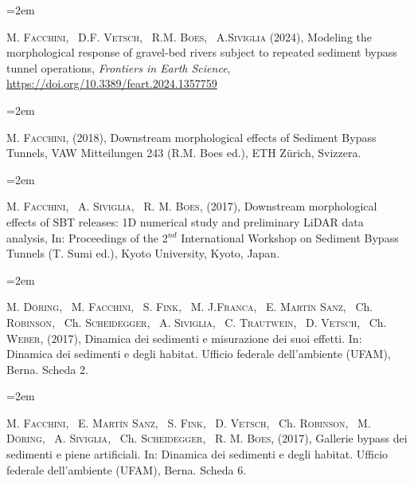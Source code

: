 \documentclass{scrartcl}
\newcommand{\MarginText}[1]{\marginpar{\raggedleft\itshape\small#1}} %
\newcommand{\Description}[1]{\hangindent=2em\hangafter=0\noindent\raggedright\footnotesize{#1}\par\normalsize\vspace{1em}} %
\begin{document}
\begin{cv}{}


\vspace{1em}

\Description{\MarginText{2024}
	M. \textsc{Facchini}, ~D.F. \textsc{Vetsch}, ~R.M. \textsc{Boes}, ~A.\textsc{Siviglia} (2024), Modeling the morphological response of gravel-bed rivers subject to repeated sediment bypass tunnel operations, \textit{Frontiers in Earth Science}, \url{https://doi.org/10.3389/feart.2024.1357759}}


\Description{\MarginText{2018}
	M. \textsc{Facchini}, (2018), Downstream morphological effects of Sediment Bypass Tunnels, VAW Mitteilungen 243 (R.M. Boes ed.), ETH Z\"urich, Svizzera.}


\Description{\MarginText{2017}
	M. \textsc{Facchini}, ~A. \textsc{Siviglia}, ~R. M. \textsc{Boes}, (2017), Downstream morphological effects of SBT releases: 1D numerical study and preliminary LiDAR data analysis, In: Proceedings of the 2$^{nd}$ International Workshop on Sediment Bypass Tunnels (T. Sumi ed.), Kyoto University, Kyoto, Japan.}

	\Description{
	M. \textsc{Döring}, ~M. \textsc{Facchini}, ~S. \textsc{Fink}, ~M. J.\textsc{Franca}, ~E. \textsc{Martín Sanz}, ~Ch. \textsc{Robinson}, ~Ch. \textsc{Scheidegger}, ~A. \textsc{Siviglia}, ~C. \textsc{Trautwein}, ~D. \textsc{Vetsch}, ~Ch. \textsc{Weber}, (2017), Dinamica dei sedimenti e misurazione dei suoi effetti. In: Dinamica dei sedimenti e degli habitat. Ufficio federale dell’ambiente (UFAM), Berna. Scheda 2.}

	\Description{
	M. \textsc{Facchini}, ~E. \textsc{Martín Sanz}, ~S. \textsc{Fink}, ~D. \textsc{Vetsch}, ~Ch. \textsc{Robinson}, ~M. \textsc{Döring}, ~A. \textsc{Siviglia}, ~Ch. \textsc{Scheidegger}, ~R. M. \textsc{Boes}, (2017), Gallerie bypass dei sedimenti e piene artificiali. In: Dinamica dei sedimenti e degli habitat. Ufficio federale dell’ambiente (UFAM), Berna. Scheda 6.}



\end{cv}
\end{document}
